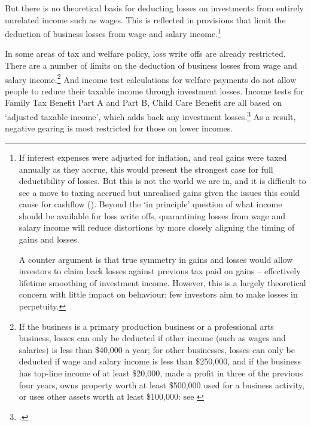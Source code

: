 \documentclass{grattanAlpha}\usepackage[]{graphicx}\usepackage[]{color}
\begin{document}
But there is no theoretical basis for deducting losses on investments from entirely unrelated income such as wages. This is reflected in provisions that limit the deduction of business losses from wage and salary income.\footnote{If interest expenses were adjusted for inflation, and real gains were taxed annually as they accrue, this would present the strongest case for full deductibility of losses. But this is not the world we are in, and it is difficult to see a move to taxing accrued but unrealised gains given the issues this could cause for cashflow (). Beyond the ‘in principle’ question of what income should be available for loss write offs, quarantining losses from wage and salary income will reduce distortions by more closely aligning the timing of gains and losses.

A counter argument is that true symmetry in gains and losses would allow investors to claim back losses against previous tax paid on gains -- effectively lifetime smoothing of investment income. However, this is a largely theoretical concern with little impact on behaviour: few investors aim to make losses in perpetuity.} 

In some areas of tax and welfare policy, loss write offs are already restricted. 
There are a number of limits on the deduction of business losses from wage and salary income.\footnote{If the business is a primary production business or a professional arts business, losses can only be deducted if other income (such as wages and salaries) is less than \$40,000 a year; for other businesses, losses can only be deducted if wage and salary income is less than \$250,000, and if the business has top-line income of at least \$20,000, made a profit in three of the previous four years, owns property worth at least \$500,000 used for a business activity, or uses other assets worth at least \$100,000: see \textcite{ATO2015OffsettingCurrentYearLosses}}
And income test calculations for welfare payments do not allow people to reduce their taxable income through investment losses. Income tests for Family Tax Benefit Part A and Part B, Child Care Benefit are all based on ‘adjusted taxable income’, which adds back any investment losses.\footcite{DHS2015AdjustedTaxableIncome} 
As a result, negative gearing is most restricted for those on lower incomes.
\end{document}
